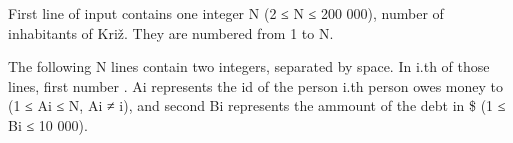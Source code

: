 First line of input contains one integer N (2 ≤ N ≤ 200 000), number of inhabitants of Križ. They are numbered from 1 to N.  

   The following N lines contain two integers, separated by space. In i.th of those lines, first number . Ai represents the id of the person  i.th person owes money to (1 ≤  Ai  ≤ N,  Ai  ≠  i), and second  Bi represents the ammount of the debt in \$ (1 ≤ Bi  ≤ 10 000).